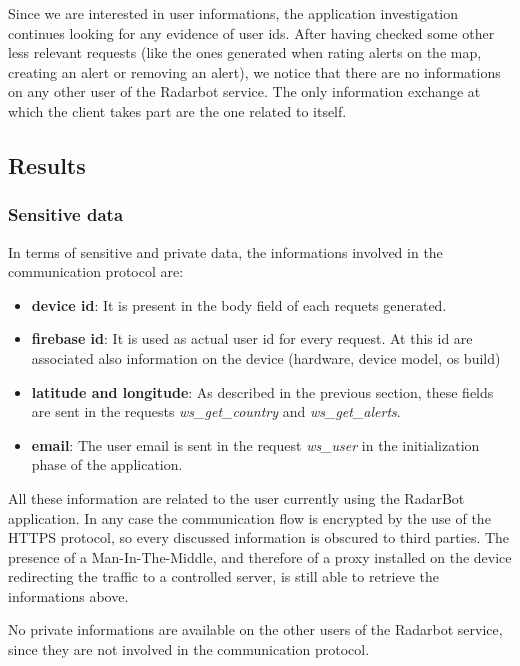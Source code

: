 			\par Since we are interested in user informations, the application investigation continues looking for any evidence of user ids. After having checked some other less relevant requests (like the ones generated when rating alerts on the map, creating an alert or removing an alert), we notice that there are no informations on any other user of the Radarbot service. The only information exchange at which the client takes part are the one related to itself.
		
	\subsection{Results}
	
	\subsubsection{Sensitive data}
		\par In terms of sensitive and private data, the informations involved in the communication protocol are:
		\begin{itemize}
			\item \textbf{device id}: It is present in the body field of each requets generated.
			\item \textbf{firebase id}: It is used as actual user id for every request. At this id are associated also information on the device (hardware, device model, os build)
			\item \textbf{latitude and longitude}: As described in the previous section, these fields are sent in the requests \textit{ws\_get\_country} and \textit{ws\_get\_alerts}.
			\item \textbf{email}: The user email is sent in the request \textit{ws\_user} in the initialization phase of the application.
		\end{itemize}
		\par All these information are related to the user currently using the RadarBot application. In any case the communication flow is encrypted by the use of the HTTPS protocol, so every discussed information is obscured to third parties. The presence of a Man-In-The-Middle, and therefore of a proxy installed on the device redirecting the traffic to a controlled server, is still able to retrieve the informations above.\newline
		\par No private informations are available on the other users of the Radarbot service, since they are not involved in the communication protocol.
		

